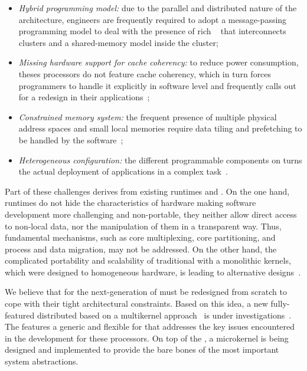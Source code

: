 	\begin{itemize}
		\item \textit{Hybrid programming model:} due to the parallel and
		distributed nature of the architecture, engineers are frequently
		required to adopt a message-passing programming model to deal
		with the presence of rich \nocs~\cite{kelly2013} that
		interconnects clusters and a shared-memory model inside the
		cluster;

		\item \textit{Missing hardware support for cache coherency:} to
		reduce power consumption, theses processors do not feature cache
		coherency, which in turn forces programmers to handle it
		explicitly in software level and frequently calls out for a
		redesign in their applications~\cite{francesquini2015};

		\item \textit{Constrained memory system:} the frequent presence
		of multiple physical address spaces and small local memories
		require data tiling and prefetching to be handled by the
		software~\cite{Castro2016};

		\item \textit{Heterogeneous configuration:} the different
		programmable components on \lightweight \manycores turns the
		actual deployment of applications in a complex
		task~\cite{barbalace2015}.
	\end{itemize}

	Part of these challenges derives from existing runtimes and \oss.
	On the one hand, runtimes do not hide the characteristics of hardware
	making software development more challenging and non-portable, \eg they
	neither allow direct access to non-local data, nor the manipulation of
	them in a transparent way. Thus, fundamental \os mechanisms, such
	as core multiplexing, core partitioning, and process and data
	migration, may not be addressed. On the other hand, the complicated
	portability and scalability of traditional \oss with a monolithic
	kernels, which were designed to homogeneous hardware, is leading to
	alternative \os designs~\cite{Baumann2009, kluge2014, nightingale2009, rhoden2011}.

	We believe that \oss for the next-generation of \lightweight
	\manycores must be redesigned from scratch to cope with their tight
	architectural constraints. Based on this idea, a new fully-featured
	distributed \os based on a multikernel approach~\cite{Baumann2009}
	is under investigations~\cite{penna2017-1,penna2017-2,penna2019}.
	The \nanvix \multikernel features a generic and flexible \hal for
	\lightweight \manycores that addresses the key issues encountered in
	the development for these processors. On top of the \nanvix
	\textit{\hal}, a microkernel is being designed and implemented
	to provide the bare bones of the most important system abstractions.

